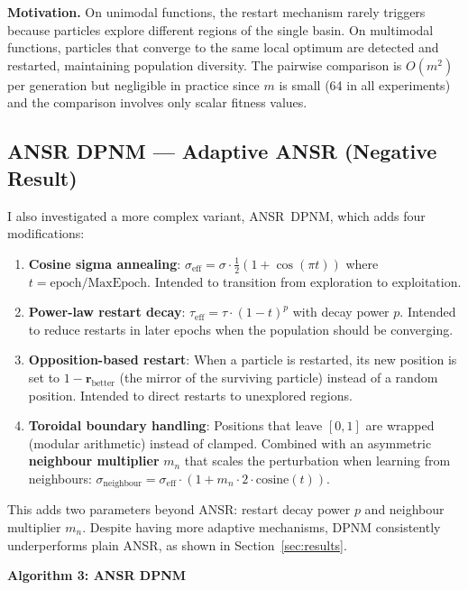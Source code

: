 \documentclass[11pt,a4paper]{article}
\begin{document}
\textbf{Motivation.} On unimodal functions, the restart mechanism rarely triggers because particles explore different regions of the single basin. On multimodal functions, particles that converge to the same local optimum are detected and restarted, maintaining population diversity. The pairwise comparison is $O(m^2)$ per generation but negligible in practice since $m$ is small (64 in all experiments) and the comparison involves only scalar fitness values.

\subsection{ANSR DPNM --- Adaptive ANSR (Negative Result)}

I also investigated a more complex variant, ANSR~DPNM, which adds four modifications:

\begin{enumerate}
    \item \textbf{Cosine sigma annealing}: $\sigma_{\text{eff}} = \sigma \cdot \tfrac{1}{2}(1 + \cos(\pi t))$ where $t = \text{epoch}/\text{MaxEpoch}$. Intended to transition from exploration to exploitation.
    \item \textbf{Power-law restart decay}: $\tau_{\text{eff}} = \tau \cdot (1 - t)^p$ with decay power $p$. Intended to reduce restarts in later epochs when the population should be converging.
    \item \textbf{Opposition-based restart}: When a particle is restarted, its new position is set to $1 - \mathbf{r}_{\text{better}}$ (the mirror of the surviving particle) instead of a random position. Intended to direct restarts to unexplored regions.
    \item \textbf{Toroidal boundary handling}: Positions that leave $[0,1]$ are wrapped (modular arithmetic) instead of clamped. Combined with an asymmetric \textbf{neighbour multiplier} $m_n$ that scales the perturbation when learning from neighbours: $\sigma_{\text{neighbour}} = \sigma_{\text{eff}} \cdot (1 + m_n \cdot 2 \cdot \text{cosine}(t))$.
\end{enumerate}

This adds two parameters beyond ANSR: restart decay power $p$ and neighbour multiplier $m_n$. Despite having more adaptive mechanisms, DPNM consistently underperforms plain ANSR, as shown in Section~\ref{sec:results}.

\bigskip
\noindent\textbf{Algorithm 3: ANSR DPNM}
\label{alg:dpnm}
\end{document}
